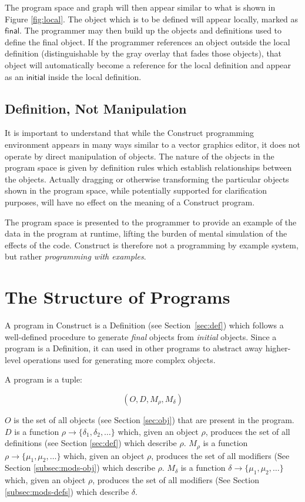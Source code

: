 \documentclass[twoside,11pt]{report}
\begin{document}
The program space and graph will then appear similar to what is shown in Figure \ref{fig:local}. 
The object which is to be defined will appear locally, marked as $\mathsf{final}$. 
The programmer may then build up the objects and definitions used to define the final object.
If the programmer references an object outside the local definition (distinguishable by the gray overlay that fades those objects), that object will automatically become a reference for the local definition and appear as an $\mathsf{initial}$ inside the local definition.

\section{Definition, Not Manipulation}
\label{sec:not-manip}

It is important to understand that while the Construct programming environment appears in many ways similar to a vector graphics editor, it does not operate by direct manipulation of objects.
The nature of the objects in the program space is given by definition rules which establish relationships between the objects. 
Actually dragging or otherwise transforming the particular objects shown in the program space, while potentially supported for clarification purposes, will have no effect on the meaning of a Construct program.

The program space is presented to the programmer to provide an example of the data in the program at runtime, lifting the burden of mental simulation of the effects of the code. 
Construct is therefore not a programming by example\cite{smith1975pygmalion} system, but rather {\it programming with examples}\cite{myers1986taxonomy}.


\chapter{The Structure of Programs}
\label{chap:struct}

A program in Construct is a Definition (see Section~\ref{sec:def}) which follows a well-defined procedure to generate {\it final} objects from {\it initial} objects. 
Since a program is a Definition, it can used in other programs to abstract away higher-level operations used for generating more complex objects.

A program is a tuple:

$$(O, D, M_\rho, M_\delta)$$

$O$ is the set of all objects (see Section \ref{sec:obj}) that are present in the program. 
$D$ is a function $\rho \to \{\delta_1, \delta_2, \dots\}$ which, given an object $\rho$, produces the set of all definitions (see Section \ref{sec:def}) which describe $\rho$.
$M_\rho$ is a function $\rho \to \{\mu_1, \mu_2, \dots\}$ which, given an object $\rho$, produces the set of all modifiers (See Section \ref{subsec:mods-obj}) which describe $\rho$.
$M_\delta$ is a function $\delta \to \{\mu_1, \mu_2, \dots\}$ which, given an object $\rho$, produces the set of all modifiers (See Section \ref{subsec:mods-defs}) which describe $\delta$.
\end{document}
